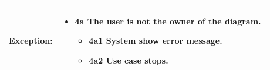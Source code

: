 \begin{table}[]
\begin{tabular}{| m{4cm} | m{11cm} |}
Exception: & \begin{itemize}
    \item {4a The user is not the owner of the diagram.}
    \begin{itemize}
        \item 4a1 System show error message.
        \item 4a2 Use case stops.
    \end{itemize}
\end{itemize} \\ \hline
\end{tabular}
\end{table}


